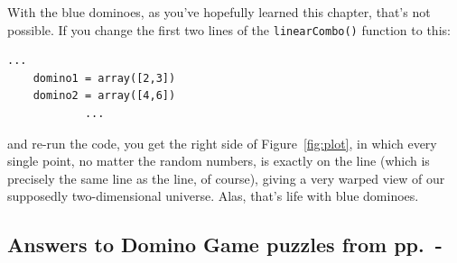 With the blue dominoes, as you've hopefully learned this chapter, that's not
possible. If you change the first two lines of the \texttt{linearCombo()}
function to this:

\begin{Verbatim}[fontsize=\small,samepage=true,frame=single,framesep=3mm]
            ...
    domino1 = array([2,3])
    domino2 = array([4,6])
            ...
\end{Verbatim}

and re-run the code, you get the right side of Figure~\ref{fig:plot}, in which
every single point, no matter the random numbers, is exactly on the 
line (which is precisely the same line as the 
 line, of course), giving a very warped view of our supposedly two-dimensional
universe. Alas, that's life with blue dominoes.

\vfill

\pagebreak
\subsection*{Answers to Domino Game puzzles from
pp.~\pageref{startDominoPuzzles}-\pageref{endDominoPuzzes}}
\label{dominoPuzzleAnswers}

